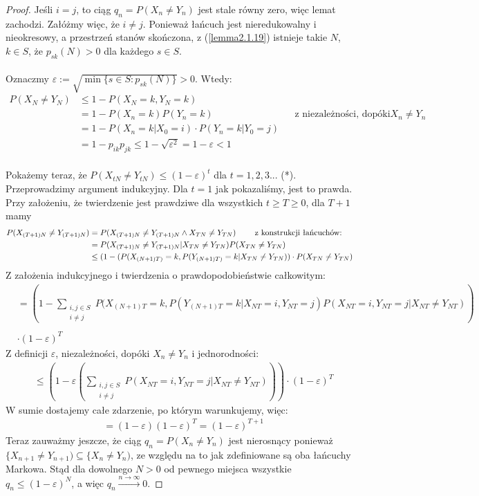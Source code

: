 \documentclass[a4paper]{article}
\theoremstyle{defn}
\theoremstyle{theorem}
\theoremstyle{lemma}
\theoremstyle{cor}
\theoremstyle{fact}
\begin{document}
\begin{proof}
Jeśli $i = j$, to ciąg $q_n = P(X_n \neq Y_n)$ jest stale równy zero, więc lemat zachodzi. Załóżmy więc, że $i \neq j$. Ponieważ łańcuch jest nieredukowalny i nieokresowy, a przestrzeń stanów skończona, z (\ref{lemma2.1.19}) istnieje takie $N$, $k \in S$, że $p_{sk}(N) > 0$ dla każdego $s \in S$.\\\\
Oznaczmy $\varepsilon := \sqrt{\min\{s \in S: p_{sk}(N)\}} > 0$. Wtedy:
\begin{align*}
P(X_N \neq Y_N) &\leq 1 - P(X_N = k, Y_N = k) \\
&= 1 - P(X_n = k)P(Y_n = k) && \text{z niezależności, dopóki $X_n \neq Y_n$} \\
&= 1 - P(X_n = k|X_0 = i) \cdot P(Y_n = k|Y_0 = j) \\
&= 1 - p_{ik}p_{jk} \leq 1 - \sqrt{\varepsilon^2} = 1 - \varepsilon < 1
\end{align*}
\\
Pokażemy teraz, że $P(X_{tN} \neq Y_{tN}) \leq (1-\varepsilon)^t$ dla $t=1,2,3...$ (*). Przeprowadzimy argument indukcyjny. Dla $t = 1$ jak pokazaliśmy, jest to prawda. Przy założeniu, że twierdzenie jest prawdziwe dla wszystkich $t \geq T \geq 0$, dla $T+1$ mamy
\begin{align*}
    P(X_{(T+1)N} \neq Y_{(T+1)N}) &= P(X_{(T+1)N} \neq Y_{(T+1)N} \land X_{TN} \neq Y_{TN})
    \text{ \quad\quad z konstrukcji łańcuchów:}\\
    &= P(X_{(T+1)N} \neq Y_{(T+1)N} | X_{TN} \neq Y_{TN})P(X_{TN} \neq Y_{TN})\\
    &\leq (1 - (P(X_{(N+1)T)} = k, P(Y_{(N+1)T)} = k  |  X_{TN} \neq Y_{TN})) \cdot P(X_{TN} \neq Y_{TN})
    \end{align*}
    Z założenia indukcyjnego i twierdzenia o prawdopodobieństwie całkowitym:
    \begin{align*}
    & = \left(1 - \sum\limits_{\substack{i,j \in S\\i\neq j}} P(X_{(N+1)T} = k, P(Y_{(N+1)T} = k | X_{NT} = i, Y_{NT} = j)P(X_{NT} = i, Y_{NT} = j | X_{NT} \neq Y_{NT})\right)\\\\
    &\cdot (1 - \varepsilon)^T
\end{align*}
 Z definicji $\varepsilon$, niezależności, dopóki $X_n \neq Y_n$ i jednorodności:
\begin{align*}
    &\leq \left( 1 - \varepsilon \left(\sum_{\substack{i,j \in S\\i\neq j}} P(X_{NT} = i, Y_{NT} = j | X_{NT} \neq Y_{NT})\right)\right)\cdot (1- \varepsilon)^T
\end{align*}
W sumie dostajemy całe zdarzenie, po którym warunkujemy, więc:
\begin{align*}
    &= (1-\varepsilon)(1-\varepsilon)^T = (1- \varepsilon)^{T+1}
\end{align*}
Teraz zauważmy jeszcze, że ciąg $q_n = P(X_n \neq Y_n)$ jest nierosnący ponieważ $\{X_{n+1} \neq Y_{n+1}) \subseteq \{X_{n} \neq Y_{n})$, ze względu na to jak zdefiniowane są oba łańcuchy Markowa. Stąd dla dowolnego $N > 0$ od pewnego miejsca wszystkie $q_n \leq (1-\varepsilon)^N$, a więc $q_n \xrightarrow{n \to \infty} 0$.
\end{proof}
\end{document}
